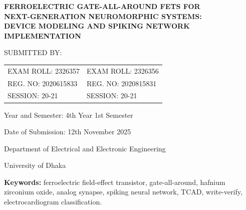 \documentclass[12pt,a4paper,oneside]{article}
\begin{document}
\begin{titlepage}
\centering
\vspace*{1.2in}

{\large\bfseries
FERROELECTRIC GATE-ALL-AROUND FETS FOR\\[0.35em]
NEXT-GENERATION NEUROMORPHIC SYSTEMS:\\[0.35em]
DEVICE MODELING AND SPIKING NETWORK\\[0.35em]
IMPLEMENTATION\par}

\vspace{0.9in}

{\large SUBMITTED BY:\par}
\vspace{0.35in}

\begin{tabular}{p{2.3in}p{2.3in}}
\centering EXAM ROLL: 2326357   & \centering\arraybackslash EXAM ROLL: 2326356   \\[0.35em]
\centering REG. NO: 2020615833  & \centering\arraybackslash REG. NO: 2020815831  \\[0.35em]
\centering SESSION: 20-21       & \centering\arraybackslash SESSION: 20-21       \\
\end{tabular}

\vspace{0.9in}

Year and Semester: 4th Year 1st Semester\par
\vspace{0.25em}
Date of Submission: 12th November 2025\par

\vfill

Department of Electrical and Electronic Engineering\par
\vspace{0.25em}
University of Dhaka\par
\vspace{0.6in}
\end{titlepage}

\onehalfspacing



\vspace{1em}
\noindent\textbf{Keywords:} ferroelectric field-effect transistor,
gate-all-around, hafnium zirconium oxide, analog synapse, spiking neural
network, TCAD, write-verify, electrocardiogram classification.
\end{document}
